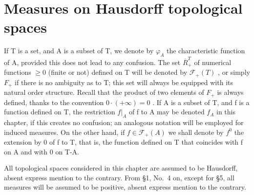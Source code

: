 \chapter{Measures on Hausdorff topological spaces}

If T is a set, and A is a subset of T, we denote by \(\varphi_{A}\) the characteristic function of A, provided this does not lead to any confusion. The set \(\overline{R}_{+}^{T}\) of numerical functions \(\geqslant0\) (finite or not) defined on T will be denoted by \(\mathcal{F}_{+}(T)\) , or simply \(F_{+}\) if there is no ambiguity as to T; this set will always be equipped with its natural order structure. Recall that the product of two elements of \(F_{+}\) is always defined, thanks to the convention \(0\cdot(+\infty)=0\) . If A is a subset of T, and f is a function defined on T, the restriction \(f|_{A}\) of f to A may be denoted \(f_{A}\) in this chapter, if this creates no confusion; an analogous notation will be employed for induced measures. On the other hand, if \(f\in\mathcal{F}_{+}(A)\) we shall denote by \(f^{0}\) the extension by 0 of f to T, that is, the function defined on T that coincides with f on A and with 0 on T-A.

All topological spaces considered in this chapter are assumed to be Hausdorff, absent express mention to the contrary. From §1, No.~4 on, except for §5, all measures will be assumed to be positive, absent express mention to the contrary.

